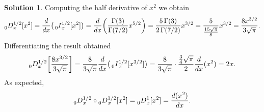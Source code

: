 \documentclass[12pt]{article}
\theoremstyle{definition}
\newtheorem*{solution*}{Solution}
\newcommand{\D}[2]{\prescript{}{#1}{D}_x^{#2}}
\newcommand{\I}[2]{\prescript{}{#1}{I}_x^{#2}}
\begin{document}
\begin{solution*}
Computing the half derivative of $x^2$ we obtain
\[
\D{0}{1/2}[x^2] = \frac{d}{dx}\big(\I{0}{1/2}[x^2]\big) =
 \frac{d}{dx}\bigg(\frac{\Gamma(3)}{\Gamma(7/2)}x^{5/2}\bigg) 
= \frac{5\, \Gamma(3)}{2\, \Gamma(7/2)} x^{3/2} = \frac{5}{\frac{15\sqrt{\pi}}{8}} x^{3/2} = \frac{8 x^{3/2}}{3\sqrt{\pi}}.
\]
Differentiating the result obtained
\[
\D{0}{1/2}\bigg[\frac{8 x^{3/2}}{3\sqrt{\pi}}\bigg] = 
\frac{8}{3\sqrt{\pi}} \frac{d}{dx}\big(\I{0}{1/2}[x^{3/2}]\big)
=\frac{8}{3\sqrt{\pi}} \cdot \frac{\frac{3}{4}\sqrt{\pi}}{2} \frac{d}{dx}(x^2) = 2 x.
\]
As expected,
\[
\D{0}{1/2}\circ \D{0}{1/2}[x^2] = \D{0}{1}[x^2] = \frac{d(x^2)}{dx}.
\]
\end{solution*}
\end{document}
